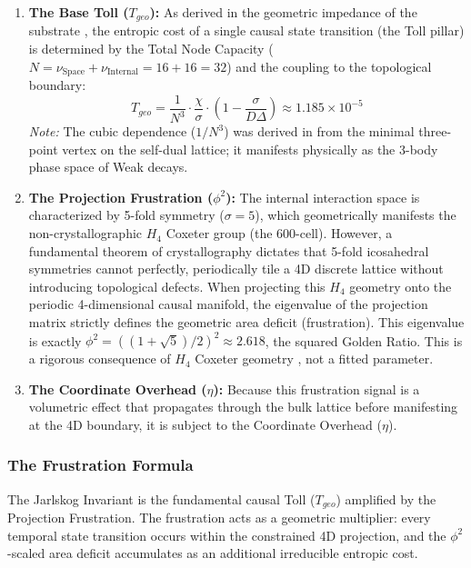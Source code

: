 \begin{enumerate}
    \item \textbf{The Base Toll ($T_{geo}$):} As derived in the geometric impedance of the substrate \cite{meyer_informational_2026}, the entropic cost of a single causal state transition (the Toll pillar) is determined by the Total Node Capacity ($N = \nu_{\text{Space}} + \nu_{\text{Internal}} = 16 + 16 = 32$) and the coupling to the topological boundary:
    \begin{equation}
        T_{geo} = \frac{1}{N^3} \cdot \frac{\chi}{\sigma} \cdot \left(1 - \frac{\sigma}{D\Delta}\right) \approx 1.185 \times 10^{-5}
    \end{equation}
    \textit{Note:} The cubic dependence ($1/N^3$) was derived in \cite{meyer_informational_2026} from the minimal three-point vertex on the self-dual lattice; it manifests physically as the 3-body phase space of Weak decays.
    
    \item \textbf{The Projection Frustration ($\phi^2$):} The internal interaction space is characterized by 5-fold symmetry ($\sigma=5$), which geometrically manifests the non-crystallographic $H_4$ Coxeter group (the 600-cell). However, a fundamental theorem of crystallography dictates that 5-fold icosahedral symmetries cannot perfectly, periodically tile a 4D discrete lattice without introducing topological defects. When projecting this $H_4$ geometry onto the periodic 4-dimensional causal manifold, the eigenvalue of the projection matrix strictly defines the geometric area deficit (frustration). This eigenvalue is exactly $\phi^2 = ((1+\sqrt{5})/2)^2 \approx 2.618$, the squared Golden Ratio. This is a rigorous consequence of $H_4$ Coxeter geometry \cite{moody_quasicrystals_1993}, not a fitted parameter.
    
    \item \textbf{The Coordinate Overhead ($\eta$):} Because this frustration signal is a volumetric effect that propagates through the bulk lattice before manifesting at the 4D boundary, it is subject to the Coordinate Overhead ($\eta$).
\end{enumerate}

\subsubsection{The Frustration Formula}
The Jarlskog Invariant is the fundamental causal Toll ($T_{geo}$) amplified by the Projection Frustration. The frustration acts as a geometric multiplier: every temporal state transition occurs within the constrained 4D projection, and the $\phi^2$-scaled area deficit accumulates as an additional irreducible entropic cost.

